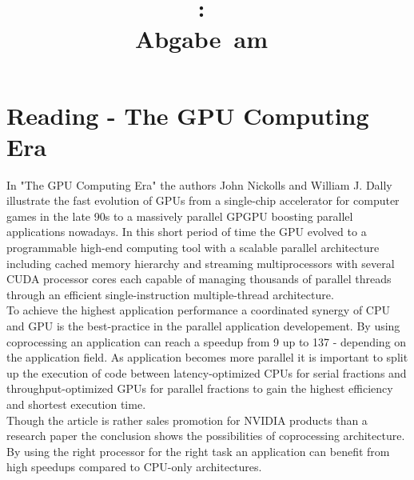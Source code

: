 \documentclass{article}
\title{
\vspace{2in}
\textmd{\textbf{\hmwkClass:\ \hmwkTitle}}\\
\normalsize\vspace{0.1in}\small{Abgabe\ am\ \hmwkDueDate}\\
\vspace{0.1in}\large{\textit{\hmwkClassTime}}
\vspace{3in}
}
\author{\textbf{\hmwkAuthorName}}
\date{} %
\newcommand{\enterProblemHeader}[1]{
}
\newcommand{\exitProblemHeader}[1]{
}
\newcounter{homeworkProblemCounter} %
\newcommand{\homeworkProblemName}{}
\newenvironment{homeworkProblem}[1][Problem \arabic{homeworkProblemCounter}]{ %
\stepcounter{homeworkProblemCounter} %
\renewcommand{\homeworkProblemName}{#1} %
\section{\homeworkProblemName} %
}{
}
\begin{document}
\maketitle


\newpage
\tableofcontents
\newpage


\begin{homeworkProblem}[Reading - The GPU Computing Era]
In "The GPU Computing Era" the authors John Nickolls and William J. Dally illustrate the fast
evolution of GPUs from a single-chip accelerator for computer games in the late 90s to a
massively parallel GPGPU boosting parallel applications nowadays. In this short period of time
the GPU evolved to a programmable high-end computing tool with a scalable parallel
architecture including cached memory hierarchy and streaming multiprocessors with several CUDA
processor cores each capable of managing thousands of parallel threads through an efficient
single-instruction multiple-thread architecture. \\

To achieve the highest application performance a coordinated synergy of CPU and GPU is the
best-practice in the parallel application developement. By using coprocessing an application
can reach a speedup from 9 up to 137 - depending on the application field. As application
becomes more parallel it is important to split up the execution of code between 
latency-optimized CPUs for serial fractions and throughput-optimized GPUs for parallel
fractions to gain the highest efficiency and shortest execution time. \\

Though the article is rather sales promotion for NVIDIA products than a research paper the
conclusion shows the possibilities of coprocessing architecture. By using the right processor
for the right task an application can benefit from high speedups compared to CPU-only
architectures.    
\end{homeworkProblem}
\end{document}
